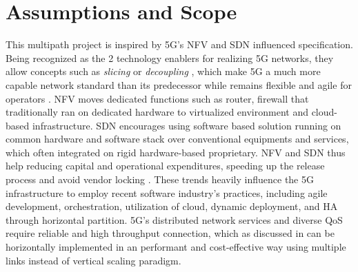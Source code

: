



\section{Assumptions and Scope}


This multipath project is inspired by \ac{5G}'s \ac{NFV} and \ac{SDN} influenced specification.
Being recognized as the 2 technology enablers for realizing 5G networks, they allow concepts such as \textit{slicing} or \textit{decoupling} \cite{yousaf_nfv_sdn_key_techno_for_5g2017} \cite{open_baton}, which make \ac{5G} a much more capable network standard than its predecessor while remains flexible and agile for operators .
\ac{NFV} moves dedicated functions such as router, firewall that traditionally ran on dedicated hardware to virtualized environment and cloud-based infrastructure.
\ac{SDN} encourages using software based solution running on common hardware and software stack over conventional equipments and services, which often integrated on rigid hardware-based proprietary.
\ac{NFV} and \ac{SDN} thus help reducing capital and operational expenditures, speeding up the release process and avoid vendor locking \cite{yousaf_nfv_sdn_key_techno_for_5g2017}\cite{sun_integrating_2015}.
These trends heavily influence the 5G infrastructure to employ recent software industry's practices, including agile development, orchestration, utilization of cloud, dynamic deployment, and \ac{HA} through horizontal partition.
\ac{5G}'s distributed network services and diverse \ac{QoS} require reliable and high throughput connection, which as discussed in  can be horizontally implemented in an performant and cost-effective way using multiple links instead of vertical scaling paradigm.

